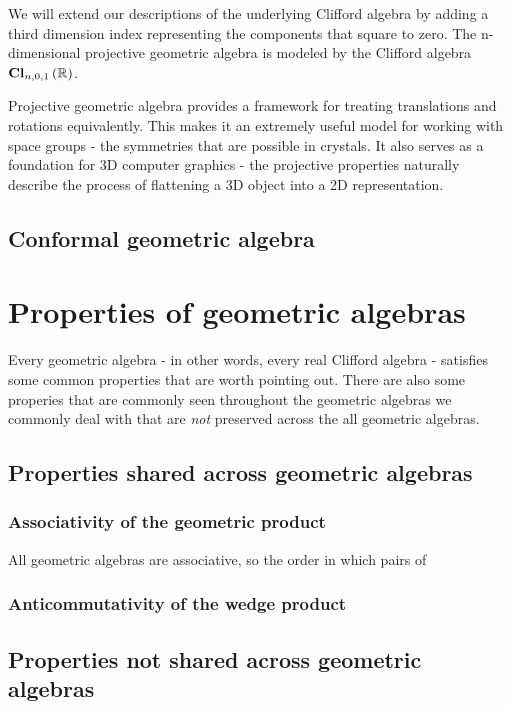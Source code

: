 We will extend our descriptions of the underlying Clifford algebra by adding a third dimension index
representing the components that square to zero. The n-dimensional projective geometric algebra is
modeled by the Clifford algebra $\operatorname{\mathbf{Cl}}_{n,0,1}\left(\mathbb{R}\right)$.

Projective geometric algebra provides a framework for treating translations and rotations
equivalently. This makes it an extremely useful model for working with space groups - the symmetries
that are possible in crystals. It also serves as a foundation for 3D computer graphics - the
projective properties naturally describe the process of flattening a 3D object into a 2D
representation.

\subsection{Conformal geometric algebra}

\section{Properties of geometric algebras}

Every geometric algebra - in other words, every real Clifford algebra - satisfies some common
properties that are worth pointing out. There are also some properies that are commonly seen
throughout the geometric algebras we commonly deal with that are \textit{not} preserved across the
all geometric algebras.

\subsection{Properties shared across geometric algebras}

\subsubsection{Associativity of the geometric product}

All geometric algebras are associative, so the order in which pairs of 

\subsubsection{Anticommutativity of the wedge product}

\subsection{Properties not shared across geometric algebras}

